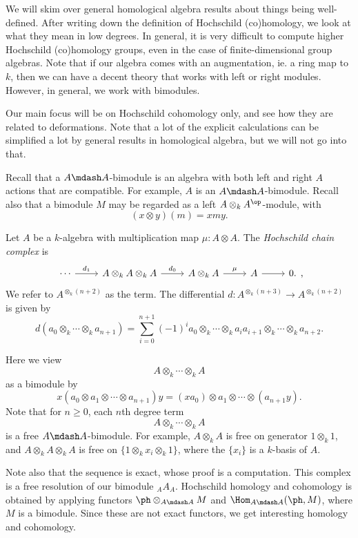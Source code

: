 \documentclass[a4paper]{article}
\begin{document}
We will skim over general homological algebra results about things being well-defined. After writing down the definition of Hochschild (co)homology, we look at what they mean in low degrees. In general, it is very difficult to compute higher Hochschild (co)homology groups, even in the case of finite-dimensional group algebras. Note that if our algebra comes with an augmentation, ie. a ring map to $k$, then we can have a decent theory that works with left or right modules. However, in general, we work with bimodules.

Our main focus will be on Hochschild cohomology only, and see how they are related to deformations. Note that a lot of the explicit calculations can be simplified a lot by general results in homological algebra, but we will not go into that.

Recall that a $A\mdash A$-bimodule is an algebra with both left and right $A$ actions that are compatible. For example, $A$ is an $A\mdash A$-bimodule. Recall also that a bimodule $M$ may be regarded as a left $A \otimes_k A^{\op}$-module, with
\[
  (x \otimes y)(m) = x my.
\]
\begin{defi}
  Let $A$ be a $k$-algebra with multiplication map $\mu: A \otimes A$. The \emph{Hochschild chain complex} is
  \[
    \begin{tikzcd}
      \cdots \ar[r, "d_1"] & A \otimes_k A \otimes_k A \ar[r, "d_0"] & A \otimes_k A \ar[r, "\mu"] & A \ar[r] & 0.
    \end{tikzcd},
  \]
  We refer to $A^{\otimes_k(n + 2)}$ as the  term. The differential $d: A^{\otimes_k (n + 3)} \to A^{\otimes_k(n + 2)}$ is given by
  \[
    d(a_0 \otimes_k \cdots \otimes_k a_{n + 1}) = \sum_{i = 0}^{n + 1} (-1)^i a_0 \otimes_k \cdots \otimes_k a_i a_{i + 1} \otimes_k \cdots \otimes_k a_{n + 2}.
  \]
\end{defi}
Here we view
\[
  A \otimes_k \cdots \otimes_k A
\]
as a bimodule by
\[
  x(a_0 \otimes a_1 \otimes \cdots \otimes a_{n + 1})y = (x a_0) \otimes a_1 \otimes \cdots \otimes (a_{n + 1} y).
\]
Note that for $n \geq 0$, each $n$th degree term
\[
  A \otimes_k \cdots \otimes_k A
\]
is a free $A\mdash A$-bimodule. For example, $A \otimes_k A$ is free on generator $1 \otimes_k 1$, and $A \otimes_k A \otimes_k A$ is free on $\{1 \otimes_k x_i \otimes_k 1\}$, where the $\{x_i\}$ is a $k$-basis of $A$.

Note also that the sequence is exact, whose proof is a computation. This complex is a free resolution of our bimodule $_AA_A$. Hochschild homology and cohomology is obtained by applying functors $\ph\otimes_{A\mdash A} M$ and $\Hom_{A\mdash A}(\ph, M)$, where $M$ is a bimodule. Since these are not exact functors, we get interesting homology and cohomology.
\end{document}
